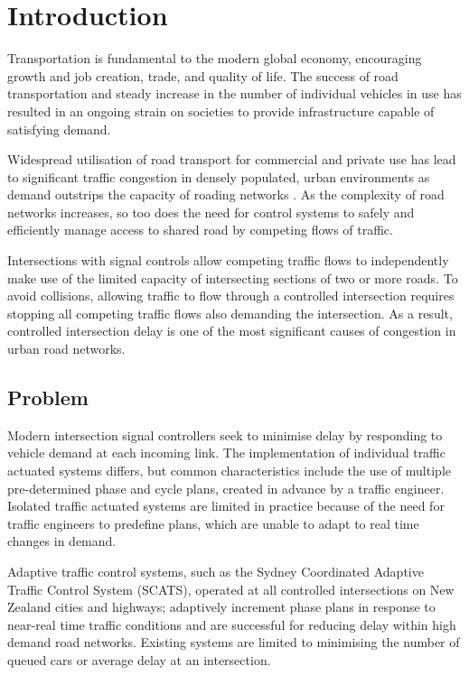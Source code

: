 \chapter{Introduction}

Transportation is fundamental to the modern global economy, encouraging growth and job creation, trade, and quality of life. The success of road transportation and steady increase in the number of individual vehicles in use has resulted in an ongoing strain on societies to provide infrastructure capable of satisfying demand. 

Widespread utilisation of road transport for commercial and private use has lead to significant traffic congestion in densely populated, urban environments as demand outstrips the capacity of roading networks \cite{euro2011whitepaper}. As the complexity of road networks increases, so too does the need for control systems to safely and efficiently manage access to shared road by competing flows of traffic. 

Intersections with signal controls allow competing traffic flows to independently make use of the limited capacity of intersecting sections of  two or more roads. To avoid collisions, allowing traffic to flow through a controlled intersection requires stopping all competing traffic flows also demanding the intersection. As a result, controlled intersection delay is one of the most significant causes of congestion in urban road networks.

\section{Problem}

Modern intersection signal controllers seek to minimise delay by responding to vehicle demand at each incoming link. The implementation of individual traffic actuated systems differs, but common characteristics include the use of multiple pre-determined phase and cycle plans, created in advance by a traffic engineer. Isolated traffic actuated systems are limited in practice because of the need for traffic engineers to predefine plans, which are unable to adapt to real time changes in demand. 

Adaptive traffic control systems, such as the Sydney Coordinated Adaptive Traffic Control System (SCATS), operated at all controlled intersections on New Zealand cities and highways; adaptively increment phase plans in response to near-real time traffic conditions and are successful for reducing delay within high demand road networks. Existing systems are limited to minimising the number of queued cars or average delay at an intersection.


